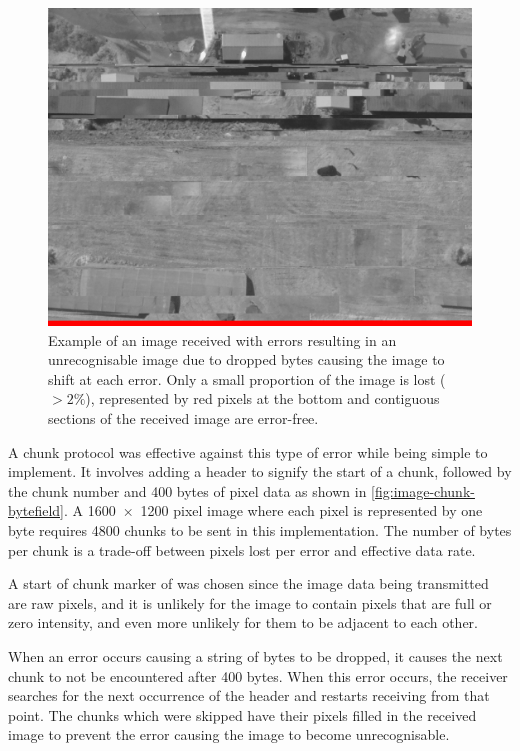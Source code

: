 \documentclass[draft]{report}
\begin{document}
\begin{figure}[H]
  \centering
  \includegraphics[width=\linewidth]{images/results/sheds_naive.png}
  \caption{Example of an image received with errors resulting in an unrecognisable image due to dropped bytes causing the image to shift at each error. Only a small proportion of the image is lost ($>2\%$), represented by red pixels at the bottom and contiguous sections of the received image are error-free.}
  \label{fig:image-sheds-error-demo}
\end{figure}

A chunk protocol was effective against this type of error while being simple to implement. It involves adding a header to signify the start of a chunk, followed by the chunk number and 400 bytes of pixel data as shown in \ref{fig:image-chunk-bytefield}. A \SI{1600x1200}{} pixel image where each pixel is represented by one byte requires 4800 chunks to be sent in this implementation. The number of bytes per chunk is a trade-off between pixels lost per error and effective data rate.

A start of chunk marker of \texttt{} was chosen since the image data being transmitted are raw pixels, and it is unlikely for the image to contain pixels that are full or zero intensity, and even more unlikely for them to be adjacent to each other.

When an error occurs causing a string of bytes to be dropped, it causes the next chunk to not be encountered after 400 bytes. When this error occurs, the receiver searches for the next occurrence of the header and restarts receiving from that point. The chunks which were skipped have their pixels filled in the received image to prevent the error causing the image to become unrecognisable.
\end{document}

